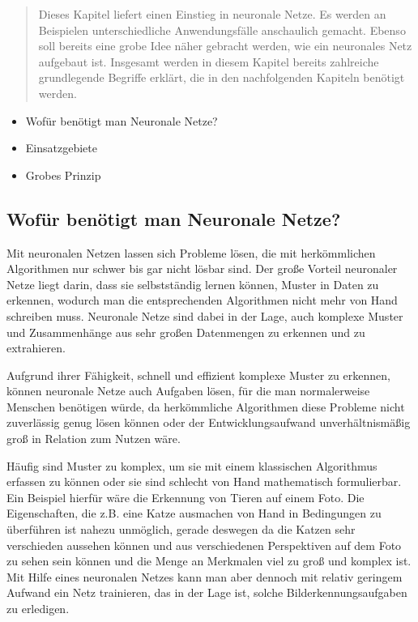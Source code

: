 \begin{tcolorbox}[title={Inhalt}]
  \begin{quotation}\noindent
      Dieses Kapitel liefert einen Einstieg in neuronale Netze. Es werden an Beispielen unterschiedliche Anwendungsfälle anschaulich gemacht.
      Ebenso soll bereits eine grobe Idee näher gebracht werden, wie ein neuronales Netz aufgebaut ist.
      Insgesamt werden in diesem Kapitel bereits zahlreiche grundlegende Begriffe erklärt, die in den nachfolgenden Kapiteln benötigt werden.
  \end{quotation}
  \begin{itemize}  
    \item Wofür benötigt man Neuronale Netze?
    \item Einsatzgebiete
    \item Grobes Prinzip
  \end{itemize}
\end{tcolorbox}

\subsection{Wofür benötigt man Neuronale Netze?}\label{subsec:einleitung_nn:wofuer_nn}
Mit neuronalen Netzen lassen sich Probleme lösen, die mit herkömmlichen Algorithmen nur schwer bis gar nicht lösbar sind.
Der große Vorteil neuronaler Netze liegt darin, dass sie selbstständig lernen können, Muster in Daten zu erkennen, wodurch man die entsprechenden Algorithmen nicht mehr von Hand schreiben muss.
Neuronale Netze sind dabei in der Lage, auch komplexe Muster und Zusammenhänge aus sehr großen Datenmengen zu erkennen und zu extrahieren.

\bigbreak\noindent
Aufgrund ihrer Fähigkeit, schnell und effizient komplexe Muster zu erkennen, können neuronale Netze auch Aufgaben lösen, für die man normalerweise Menschen benötigen würde, da herkömmliche Algorithmen diese Probleme nicht zuverlässig genug lösen können oder der Entwicklungsaufwand unverhältnismäßig groß in Relation zum Nutzen wäre.

\bigbreak\noindent
Häufig sind Muster zu komplex, um sie mit einem klassischen Algorithmus erfassen zu können oder sie sind schlecht von Hand mathematisch formulierbar.
Ein Beispiel hierfür wäre die Erkennung von Tieren auf einem Foto. Die Eigenschaften, die z.B. eine Katze ausmachen von Hand in Bedingungen zu überführen ist nahezu unmöglich, gerade deswegen da die Katzen sehr verschieden aussehen können und aus verschiedenen Perspektiven auf dem Foto zu sehen sein können und die Menge an Merkmalen viel zu groß und komplex ist.
Mit Hilfe eines neuronalen Netzes kann man aber dennoch mit relativ geringem Aufwand ein Netz trainieren, das in der Lage ist, solche Bilderkennungsaufgaben zu erledigen.

